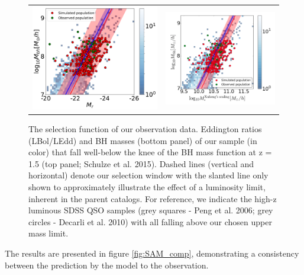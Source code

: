 \documentclass{natureprintstyle}
\begin{document}
\begin{figure}%
\begin{tabular}{c c}
\includegraphics[width=0.5\linewidth]{MBII_ML.pdf} &
\includegraphics[width=0.5\linewidth]{MBII_MM.png} \\
\end{tabular}
\caption{
The selection function of our observation data.
Eddington ratios (LBol/LEdd) and BH masses (bottom panel) of our sample (in color) that fall well-below the knee of the BH mass function at z = 1.5 (top panel; Schulze et al. 2015). Dashed lines (vertical and horizontal) denote our selection window with the slanted line only shown to approximately illustrate the effect of a luminosity limit, inherent in the parent catalogs. For reference, we indicate the high-z luminous SDSS QSO samples (grey squares - Peng et al. 2006; grey circles - Decarli et al. 2010) with all falling above our chosen upper mass limit.
}
\label{fig:MBII_comp}
\end{figure}

The results are presented in figure \ref{fig:SAM_comp}, demonstrating a consistency between the prediction by the model to the observation.
\end{document}
